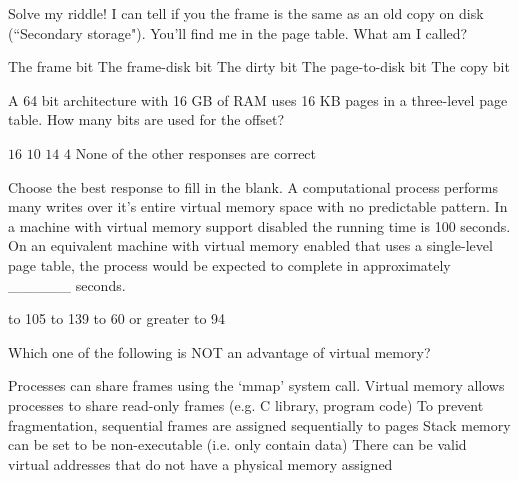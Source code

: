 \variant
Solve my riddle! I can tell if you the frame is the same as an old copy on disk (``Secondary storage"). You'll find me in the page table. What am I called?
\begin{answers}
\answer The frame bit
\answer The frame-disk bit
\correctanswer The dirty bit
\answer The page-to-disk bit
\answer The copy bit
\end{answers}
\begin{solution}
\end{solution}



\variant
A 64 bit architecture with 16 GB of RAM uses 16 KB pages in a three-level page table. How many bits are used for the offset?
\begin{answers}
\answer $16$
\answer $10$
\correctanswer $14$
\answer $4$
\answer None of the other responses are correct
\end{answers}
\begin{solution}
\end{solution}


\variant
Choose the best response to fill in the blank. A computational process performs many writes over it's entire virtual memory space with no predictable pattern. In a machine with virtual memory support disabled the running time is 100 seconds. On an equivalent machine with virtual memory enabled that uses a single-level page table, the process would be expected to complete in approximately ______ seconds.
\begin{answers}
 to 105
 to 139
 to 60
 or greater 
 to 94
\end{answers}
\begin{solution}
\end{solution}


\variant
Which one of the following is NOT an advantage of virtual memory?
\begin{answers}
\answer Processes can share frames using the `mmap' system call.
\answer Virtual memory allows processes to share read-only frames  (e.g. C library, program code)
\correctanswer To prevent fragmentation, sequential frames are assigned sequentially to pages
\answer Stack memory can be set to be non-executable (i.e. only contain data)
\answer There can be valid virtual addresses that do not have a physical memory assigned
\end{answers}
\begin{solution}
\end{solution}


